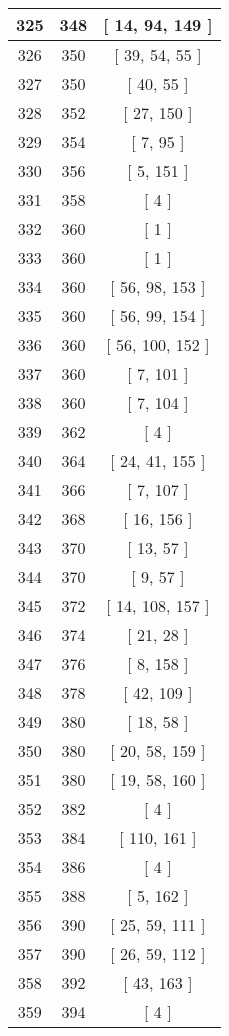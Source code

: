\begin{center}
\begin{longtable}[H]{|| c c c ||}
\hline
325 & 348 & [ 14, 94, 149 ] \\ 
\hline
326 & 350 & [ 39, 54, 55 ] \\ 
\hline
327 & 350 & [ 40, 55 ] \\ 
\hline
328 & 352 & [ 27, 150 ] \\ 
\hline
329 & 354 & [ 7, 95 ] \\ 
\hline
330 & 356 & [ 5, 151 ] \\ 
\hline
331 & 358 & [ 4 ] \\ 
\hline
332 & 360 & [ 1 ] \\ 
\hline
333 & 360 & [ 1 ] \\ 
\hline
334 & 360 & [ 56, 98, 153 ] \\ 
\hline
335 & 360 & [ 56, 99, 154 ] \\ 
\hline
336 & 360 & [ 56, 100, 152 ] \\ 
\hline
337 & 360 & [ 7, 101 ] \\ 
\hline
338 & 360 & [ 7, 104 ] \\ 
\hline
339 & 362 & [ 4 ] \\ 
\hline
340 & 364 & [ 24, 41, 155 ] \\ 
\hline
341 & 366 & [ 7, 107 ] \\ 
\hline
342 & 368 & [ 16, 156 ] \\ 
\hline
343 & 370 & [ 13, 57 ] \\ 
\hline
344 & 370 & [ 9, 57 ] \\ 
\hline
345 & 372 & [ 14, 108, 157 ] \\ 
\hline
346 & 374 & [ 21, 28 ] \\ 
\hline
347 & 376 & [ 8, 158 ] \\ 
\hline
348 & 378 & [ 42, 109 ] \\ 
\hline
349 & 380 & [ 18, 58 ] \\ 
\hline
350 & 380 & [ 20, 58, 159 ] \\ 
\hline
351 & 380 & [ 19, 58, 160 ] \\ 
\hline
352 & 382 & [ 4 ] \\ 
\hline
353 & 384 & [ 110, 161 ] \\ 
\hline
354 & 386 & [ 4 ] \\ 
\hline
355 & 388 & [ 5, 162 ] \\ 
\hline
356 & 390 & [ 25, 59, 111 ] \\ 
\hline
357 & 390 & [ 26, 59, 112 ] \\ 
\hline
358 & 392 & [ 43, 163 ] \\ 
\hline
359 & 394 & [ 4 ] \\ 

\end{longtable}
\end{center}
